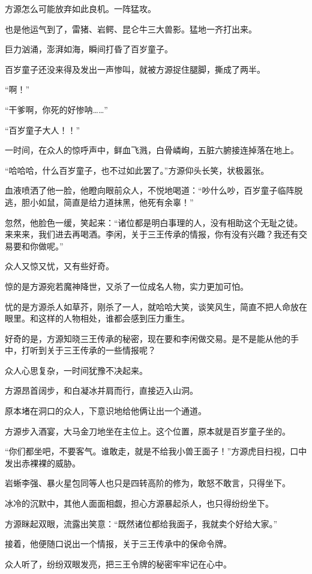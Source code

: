\begin{this_body}
方源怎么可能放弃如此良机。一阵猛攻。

也是他运气到了，雷猪、岩鳄、昆仑牛三大兽影。猛地一齐打出来。

巨力汹涌，澎湃如海，瞬间打昏了百岁童子。

百岁童子还没来得及发出一声惨叫，就被方源捉住腿脚，撕成了两半。

“啊！”

“干爹啊，你死的好惨呐……”

“百岁童子大人！！”

一时间，在众人的惊呼声中，鲜血飞溅，白骨嶙峋，五脏六腑接连掉落在地上。

“哈哈哈，什么百岁童子，也不过如此罢了。”方源仰头长笑，状极嚣张。

血液喷洒了他一脸，他瞪向眼前众人，不悦地喝道：“吵什么吵，百岁童子临阵脱逃，胆小如鼠，简直是给力道抹黑，他死有余辜！”

忽然，他脸色一缓，笑起来：“诸位都是明白事理的人，没有相助这个无耻之徒。来来来，我们进去再喝酒。李闲，关于三王传承的情报，你有没有兴趣？我还有交易要和你做呢。”

众人又惊又忧，又有些好奇。

惊的是方源宛若魔神降世，又杀了一位成名人物，实力更加可怕。

忧的是方源杀人如草芥，刚杀了一人，就哈哈大笑，谈笑风生，简直不把人命放在眼里。和这样的人物相处，谁都会感到压力重生。

好奇的是，方源知晓三王传承的秘密，现在要和李闲做交易。是不是能从他的手中，打听到关于三王传承的一些情报呢？

众人心思复杂，一时间犹豫不决起来。

方源昂首阔步，和白凝冰并肩而行，直接迈入山洞。

原本堵在洞口的众人，下意识地给他俩让出一个通道。

方源步入酒宴，大马金刀地坐在主位上。这个位置，原本就是百岁童子坐的。

“你们都坐吧，不要客气。谁敢走，就是不给我小兽王面子！”方源虎目扫视，口中发出赤裸裸的威胁。

岩蜥李强、暴火星包同等人也只是四转高阶的修为，敢怒不敢言，只得坐下。

冰冷的沉默中，其他人面面相觑，担心方源暴起杀人，也只得纷纷坐下。

方源眯起双眼，流露出笑意：“既然诸位都给我面子，我就卖个好给大家。”

接着，他便随口说出一个情报，关于三王传承中的保命令牌。

众人听了，纷纷双眼发亮，把三王令牌的秘密牢牢记在心中。

\end{this_body}

